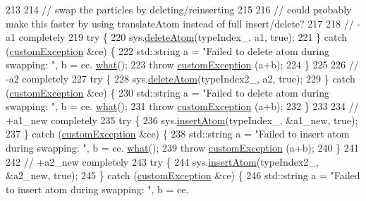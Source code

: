 \begin{DoxyCode}
213 
214         \textcolor{comment}{// swap the particles by deleting/reinserting}
215 
216         \textcolor{comment}{// could probably make this faster by using translateAtom instead of full insert/delete?}
217 
218         \textcolor{comment}{// -a1 completely}
219         \textcolor{keywordflow}{try} \{
220             sys.\hyperlink{classsim_system_acabf4fc5b5b90bba62e1449ddb3646c6}{deleteAtom}(typeIndex\_, a1, \textcolor{keyword}{true});
221         \} \textcolor{keywordflow}{catch} (\hyperlink{classcustom_exception}{customException} &ce) \{
222             std::string a = \textcolor{stringliteral}{"Failed to delete atom during swapping: "}, b = ce.
      \hyperlink{classcustom_exception_aeb6ab5848b038adfc68fde86a512f691}{what}();
223             \textcolor{keywordflow}{throw} \hyperlink{classcustom_exception}{customException} (a+b);
224         \}
225 
226         \textcolor{comment}{// -a2 completely}
227         \textcolor{keywordflow}{try} \{
228             sys.\hyperlink{classsim_system_acabf4fc5b5b90bba62e1449ddb3646c6}{deleteAtom}(typeIndex2\_, a2, \textcolor{keyword}{true});
229         \} \textcolor{keywordflow}{catch} (\hyperlink{classcustom_exception}{customException} &ce) \{
230             std::string a = \textcolor{stringliteral}{"Failed to delete atom during swapping: "}, b = ce.
      \hyperlink{classcustom_exception_aeb6ab5848b038adfc68fde86a512f691}{what}();
231             \textcolor{keywordflow}{throw} \hyperlink{classcustom_exception}{customException} (a+b);
232         \}
233 
234         \textcolor{comment}{// +a1\_new completely}
235         \textcolor{keywordflow}{try} \{
236             sys.\hyperlink{classsim_system_a0404e9435cc046d19b6bb990678ee069}{insertAtom}(typeIndex\_, &a1\_new, \textcolor{keyword}{true});
237         \} \textcolor{keywordflow}{catch} (\hyperlink{classcustom_exception}{customException} &ce) \{
238             std::string a = \textcolor{stringliteral}{"Failed to insert atom during swapping: "}, b = ce.
      \hyperlink{classcustom_exception_aeb6ab5848b038adfc68fde86a512f691}{what}();
239             \textcolor{keywordflow}{throw} \hyperlink{classcustom_exception}{customException} (a+b);
240         \}
241 
242         \textcolor{comment}{// +a2\_new completely}
243         \textcolor{keywordflow}{try} \{
244             sys.\hyperlink{classsim_system_a0404e9435cc046d19b6bb990678ee069}{insertAtom}(typeIndex2\_, &a2\_new, \textcolor{keyword}{true});
245         \} \textcolor{keywordflow}{catch} (\hyperlink{classcustom_exception}{customException} &ce) \{
246             std::string a = \textcolor{stringliteral}{"Failed to insert atom during swapping: "}, b = ce.

\end{DoxyCode}
